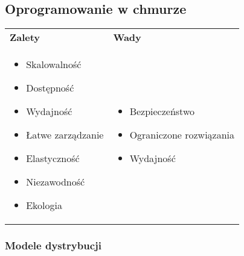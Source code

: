 \documentclass[a4paper]{article}
\begin{document}
    \subsection{Oprogramowanie w chmurze}

    \begin{table}[H]
        \begin{center}
            \begin{tabular}{ p{.5\linewidth} p{.5\linewidth}}
                \textbf{Zalety} & \textbf{Wady} \\

                \begin{itemize}
                    \item Skalowalność
                    \item Dostępność
                    \item Wydajność
                    \item Łatwe zarządzanie
                    \item Elastyczność
                    \item Niezawodność
                    \item Ekologia
                \end{itemize}
                &
                \begin{itemize}
                    \item Bezpieczeństwo
                    \item Ograniczone rozwiązania
                    \item Wydajność
                \end{itemize}
            \end{tabular}
        \end{center}
    \end{table}

    \subsubsection{Modele dystrybucji}
\end{document}
